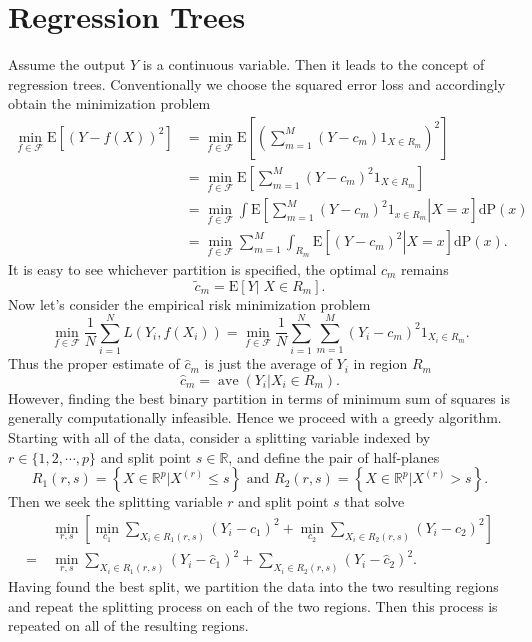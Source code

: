 \documentclass{report}
\theoremstyle{nonumberplain}
\newcommand{\0}{\mathbf{0}}
\begin{document}
\section{Regression Trees}
Assume the output $Y$ is a continuous variable. Then it leads to the concept of regression trees. Conventionally we choose the squared error loss and accordingly obtain the minimization problem
\begin{align*}
\min_{f\in\mathcal{F}}\mathrm{E}[(Y-f(X))^2]&=\min_{f\in\mathcal{F}}\mathrm{E}\left[\left(\sum_{m=1}^{M} (Y-c_{m}) 1_{X \in R_{m}}\right)^2\right]\\
&=\min_{f\in\mathcal{F}}\mathrm{E}\left[\sum_{m=1}^{M} (Y-c_{m})^2 1_{X \in R_{m}}\right]\\
&=\min_{f\in\mathcal{F}}\int\mathrm{E}\left[\left.\sum_{m=1}^{M} (Y-c_{m})^2 1_{x \in R_{m}}\right|X=x\right]\mathrm{dP}(x)\\
&=\min_{f\in\mathcal{F}}\sum_{m=1}^{M}\int_{ R_{m}}\mathrm{E}\left[\left. (Y-c_{m})^2\right|X=x\right]\mathrm{dP}(x).
\end{align*}
It is easy to see whichever partition is specified, the optimal $c_m$ remains
\[
\tilde{c}_m = \mathrm{E}[Y|\; X\in R_{m}].
\]
Now let's consider the empirical risk minimization problem
\[
\min_{f\in\mathcal{F}}\frac{1}{N}\sum_{i=1}^{N}L(Y_i,f(X_i))=\min_{f\in\mathcal{F}}\frac{1}{N}\sum_{i=1}^{N}\sum_{m=1}^{M} (Y_i-c_{m})^2 1_{X_i \in R_{m}}.
\]
Thus the proper estimate of $\hat{c}_m$ is just the average of $Y_i$ in region $R_{m}$
\[
\hat{c}_{m}=\operatorname{ave}\left(Y_{i} | X_{i} \in R_{m}\right).
\]
However, finding the best binary partition in terms of minimum sum of squares
is generally computationally infeasible. Hence we proceed with a greedy
algorithm. Starting with all of the data, consider a splitting variable indexed by $r\in\{1,2,\cdots,p\}$ and
split point $s\in\mathbb{R}$, and define the pair of half-planes
\[
R_{1}(r, s)=\left\{X\in\mathbb{R}^p | X^{(r)} \leq s\right\} \text { and } R_{2}(r, s)=\left\{X\in\mathbb{R}^p  | X^{(r)}>s\right\}.
\]
Then we seek the splitting variable $r$ and split point $s$ that solve
\begin{align*}
&\min _{r, s}\left[\min _{c_{1}} \sum_{X_{i} \in R_{1}(r, s)}\left(Y_{i}-c_{1}\right)^{2}+\min _{c_{2}} \sum_{X_{i} \in R_{2}(r, s)}\left(Y_{i}-c_{2}\right)^{2}\right]\\
=\ &\min _{r, s} \sum_{X_{i} \in R_{1}(r, s)}\left(Y_{i}-\hat{c}_{1}\right)^{2}+\sum_{X_{i} \in R_{2}(r, s)}\left(Y_{i}-\hat{c}_{2}\right)^{2}.
\end{align*}
Having found the best split, we partition the data into the two resulting
regions and repeat the splitting process on each of the two regions. Then
this process is repeated on all of the resulting regions.
\end{document}
